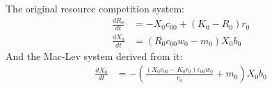 \documentclass{article}
\begin{document}
The original resource competition system:
\[\begin{align*}
\frac{dR_{0}}{dt} &= -X_{0} c_{00} + {\left(K_{0} - R_{0}\right)} r_{0}\\
\frac{dX_{0}}{dt} &= {\left(R_{0} c_{00} w_{0} - m_{0}\right)} X_{0} b_{0}
\end{align*}\]
And the Mac-Lev system derived from it: 
\[\begin{align*}
\frac{dX_{0}}{dt} &= -{\left(\frac{{\left(X_{0} c_{00} - K_{0} r_{0}\right)} c_{00} w_{0}}{r_{0}} + m_{0}\right)} X_{0} b_{0}
\end{align*}\]
\end{document}
